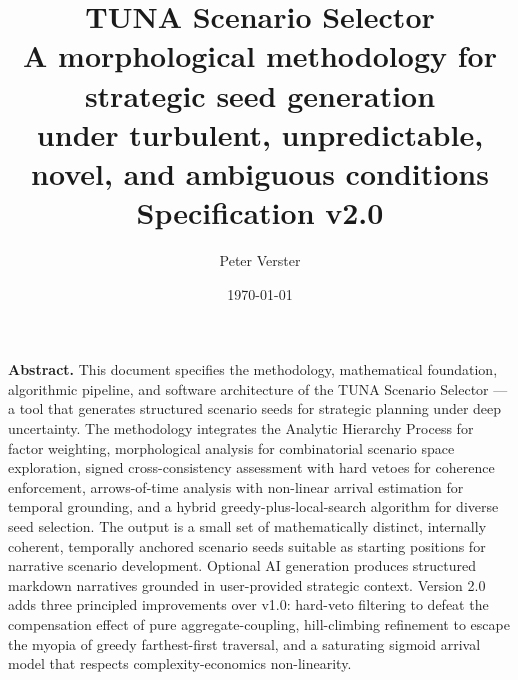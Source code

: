 \documentclass[11pt,a4paper]{article}
\title{
  \vspace{-1.5cm}
  {\Huge\bfseries\color{slate900} TUNA Scenario Selector}\\[0.5em]
  {\Large\color{slate600} A morphological methodology for strategic seed generation}\\[0.3em]
  {\large\color{slate500} under turbulent, unpredictable, novel, and ambiguous conditions}\\[1em]
  {\normalsize\color{amber500}\bfseries Specification v2.0}
}
\author{
  {\large Peter Verster}\\
}
\date{\today}
\begin{document}
\maketitle
\thispagestyle{empty}

\vspace{0.8cm}

\begin{center}
\end{center}

\vspace{0.5cm}

\begin{quoting}
\noindent\textbf{Abstract.} This document specifies the methodology, mathematical foundation, algorithmic pipeline, and software architecture of the TUNA Scenario Selector — a tool that generates structured scenario seeds for strategic planning under deep uncertainty. The methodology integrates the Analytic Hierarchy Process for factor weighting, morphological analysis for combinatorial scenario space exploration, signed cross-consistency assessment with hard vetoes for coherence enforcement, arrows-of-time analysis with non-linear arrival estimation for temporal grounding, and a hybrid greedy-plus-local-search algorithm for diverse seed selection. The output is a small set of mathematically distinct, internally coherent, temporally anchored scenario seeds suitable as starting positions for narrative scenario development. Optional AI generation produces structured markdown narratives grounded in user-provided strategic context. Version 2.0 adds three principled improvements over v1.0: hard-veto filtering to defeat the compensation effect of pure aggregate-coupling, hill-climbing refinement to escape the myopia of greedy farthest-first traversal, and a saturating sigmoid arrival model that respects complexity-economics non-linearity.
\end{quoting}
\end{document}
